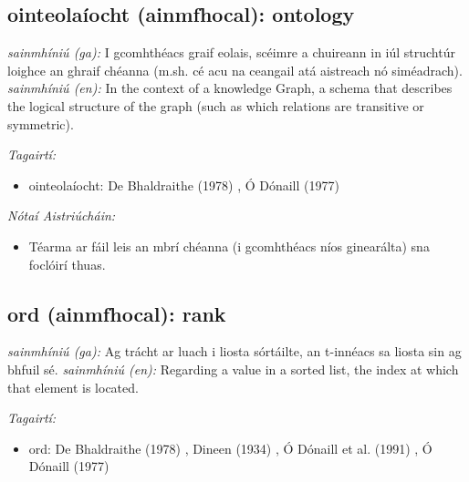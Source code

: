 \documentclass{article}
\begin{document}
\subsection*{ointeolaíocht (ainmfhocal): ontology} 
 \noindent \textit{sainmhíniú (ga):} I gcomhthéacs graif eolais, scéimre a chuireann in iúl struchtúr loighce an ghraif chéanna (m.sh. cé acu na ceangail atá aistreach nó siméadrach).
\newline\newline
 \noindent \textit{sainmhíniú (en):} In the context of a knowledge Graph, a schema that describes the logical structure of the graph (such as which relations are transitive or symmetric).
\newline

 \noindent \textit{Tagairtí:}
\begin{itemize}
	\item ointeolaíocht: De Bhaldraithe (1978) \cite{de-bhaldraithe}, Ó Dónaill (1977) \cite{odonaill}
\end{itemize}

 \noindent \textit{Nótaí Aistriúcháin:}
\begin{itemize}
	\item Téarma ar fáil leis an mbrí chéanna (i gcomhthéacs níos ginearálta) sna foclóirí thuas.
\end{itemize}


\subsection*{ord (ainmfhocal): rank} 
 \noindent \textit{sainmhíniú (ga):} Ag trácht ar luach i liosta sórtáilte, an t-innéacs sa liosta sin ag bhfuil sé.
\newline\newline
 \noindent \textit{sainmhíniú (en):} Regarding a value in a sorted list, the index at which that element is located.
\newline

 \noindent \textit{Tagairtí:}
\begin{itemize}
	\item ord: De Bhaldraithe (1978) \cite{de-bhaldraithe}, Dineen (1934) \cite{dineen}, Ó Dónaill et al. (1991) \cite{focloir-beag}, Ó Dónaill (1977) \cite{odonaill}
\end{itemize}
\end{document}
